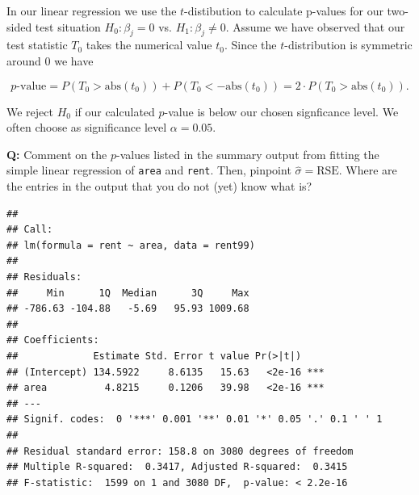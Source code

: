 \documentclass[10pt,ignorenonframetext,]{beamer}
\begin{document}
\begin{frame}

In our linear regression we use the \(t\)-distibution to calculate
p-values for our two-sided test situation \(H_0: \beta_j=0\) vs.
\(H_1: \beta_j \neq 0\). Assume we have observed that our test statistic
\(T_0\) takes the numerical value \(t_0\). Since the \(t\)-distribution
is symmetric around \(0\) we have

\[p\text{-value}=P(T_0>\text{abs}(t_0))+P(T_0<-\text{abs}(t_0))=2\cdot P(T_0>\text{abs}(t_0)).\]

We reject \(H_0\) if our calculated \(p\)-value is below our chosen
signficance level. We often choose as significance level
\(\alpha=0.05\).

\end{frame}

\begin{frame}[fragile]

\textbf{Q:} Comment on the \(p\)-values listed in the summary output
from fitting the simple linear regression of \texttt{area} and
\texttt{rent}. Then, pinpoint \(\hat{\sigma}=\text{RSE}\). Where are the
entries in the output that you do not (yet) know what is?

\footnotesize

\begin{verbatim}
## 
## Call:
## lm(formula = rent ~ area, data = rent99)
## 
## Residuals:
##     Min      1Q  Median      3Q     Max 
## -786.63 -104.88   -5.69   95.93 1009.68 
## 
## Coefficients:
##             Estimate Std. Error t value Pr(>|t|)    
## (Intercept) 134.5922     8.6135   15.63   <2e-16 ***
## area          4.8215     0.1206   39.98   <2e-16 ***
## ---
## Signif. codes:  0 '***' 0.001 '**' 0.01 '*' 0.05 '.' 0.1 ' ' 1
## 
## Residual standard error: 158.8 on 3080 degrees of freedom
## Multiple R-squared:  0.3417, Adjusted R-squared:  0.3415 
## F-statistic:  1599 on 1 and 3080 DF,  p-value: < 2.2e-16
\end{verbatim}

\normalsize

\end{frame}
\end{document}

